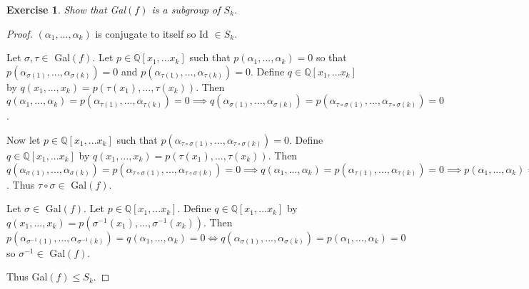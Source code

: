 \documentclass{article}
\newtheorem{exercise}[theorem]{Exercise}
\begin{document}
\begin{exercise}
Show that Gal$(f)$ is a subgroup of $S_k$.
\end{exercise}
\begin{proof}
$(\alpha_1,...,\alpha_k)$ is conjugate to itself so Id $\in S_k$.

Let $\sigma,\tau\in$ Gal$(f)$. Let $p\in\mathbb{Q}[x_1,...x_k]$ such that $p(\alpha_1,...,\alpha_k)=0$ so that $p(\alpha_{\sigma(1)},...,\alpha_{\sigma(k)})=0$ and $p(\alpha_{\tau(1)},...,\alpha_{\tau(k)})=0$. Define $q\in\mathbb{Q}[x_1,...x_k]$ by $q(x_1,...,x_k)=p(\tau(x_1),...,\tau(x_k))$. Then $q(\alpha_1,...,\alpha_k)=p(\alpha_{\tau(1)},...,\alpha_{\tau(k)})=0\implies q(\alpha_{\sigma(1)},...,\alpha_{\sigma(k)})=p(\alpha_{\tau\circ\sigma(1)},...,\alpha_{\tau\circ\sigma(k)})=0$.

Now let $p\in\mathbb{Q}[x_1,...x_k]$ such that $p(\alpha_{\tau\circ\sigma(1)},...,\alpha_{\tau\circ\sigma(k)})=0$. Define $q\in\mathbb{Q}[x_1,...x_k]$ by $q(x_1,...,x_k)=p(\tau(x_1),...,\tau(x_k))$. Then $q(\alpha_{\sigma(1)},...,\alpha_{\sigma(k)})=p(\alpha_{\tau\circ\sigma(1)},...,\alpha_{\tau\circ\sigma(k)})=0\implies q(\alpha_1,...,\alpha_k)=p(\alpha_{\tau(1)},...,\alpha_{\tau(k)})=0\implies p(\alpha_1,...,\alpha_k)=0$. Thus $\tau\circ\sigma\in$ Gal$(f)$.

Let $\sigma\in$ Gal$(f)$. Let $p\in\mathbb{Q}[x_1,...x_k]$. Define $q\in\mathbb{Q}[x_1,...x_k]$ by $q(x_1,...,x_k)=p(\sigma^{-1}(x_1),...,\sigma^{-1}(x_k))$. Then $p(\alpha_{\sigma^{-1}(1)},...,\alpha_{\sigma^{-1}(k)})=q(\alpha_1,...,\alpha_k)=0\iff q(\alpha_{\sigma(1)},...,\alpha_{\sigma(k)})=p(\alpha_1,...,\alpha_k)=0$ so $\sigma^{-1}\in$ Gal$(f)$.

Thus Gal$(f)\leqslant S_k$.
\end{proof}
\end{document}
